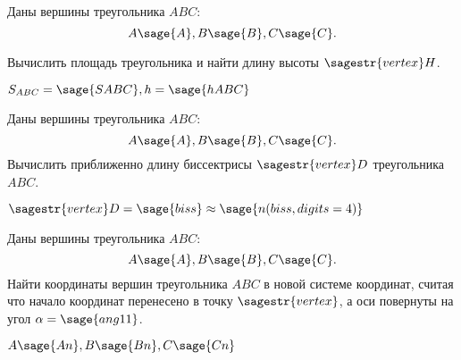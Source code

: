 \begin{question}\label{ztriag}
Даны вершины треугольника $ABC$: \[A\sage{A}, B\sage{B}, C\sage{C}.\] 

Вычислить площадь треугольника и найти длину высоты $\sagestr{vertex}H$. 
\end{question}
\begin{solution}
	\ensuremath{
		\displaystyle{S_{ABC}=\sage{SABC}, h=\sage{hABC}}           
	}
\end{solution}
\begin{question}
Даны вершины треугольника $ABC$: \[A\sage{A}, B\sage{B}, C\sage{C}.\]	
Вычислить приближенно длину биссектрисы $\sagestr{vertex}D$ треугольника $ABC$. 
\end{question}
\begin{solution}
\ensuremath{
	\displaystyle{\sagestr{vertex}D=\sage{biss}\approx\sage{n(biss, digits=4)}}           
}
\end{solution}

\begin{question}
Даны вершины треугольника $ABC$: \[A\sage{A}, B\sage{B}, C\sage{C}.\]	
Найти координаты вершин треугольника $ABC$ в новой системе координат, считая что начало координат перенесено в точку $\sagestr{vertex}$, а оси повернуты на угол \ensuremath{\displaystyle{\alpha=\sage{ang11}}}.
\end{question} 
\begin{solution}
\ensuremath{
	\displaystyle{A\sage{An}, B\sage{Bn}, C\sage{Cn}}           
}
\end{solution}	